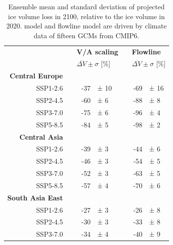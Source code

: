       \begin{table}[htp]
        \centering
        \small

        \caption{Ensemble mean and standard deviation of projected ice volume loss in 2100, relative to the ice volume in 2020. \Vas{} model and flowline model are driven by climate data of fifteen GCMs from CMIP6.}
        \label{tab:cmip}
        
        \begin{tabular}{@{}rlrllrl@{}}
          \toprule
          {} & \phantom{a} & \multicolumn{2}{l}{\textbf{V/A scaling}} & \phantom{a} & \multicolumn{2}{l}{\textbf{Flowline}} \\
          {} & \phantom{a} & \multicolumn{2}{l}{$\overline{\Delta V} \pm \sigma$ [\si{\percent}]} & \phantom{a} & \multicolumn{2}{l}{$\overline{\Delta V} \pm \sigma$ [\si{\percent}]} \\
          \midrule
          \textbf{Central Europe}\\
          SSP1-2.6 & \phantom{a} & -37 & ± 10 & \phantom{a} & -69 & ± 16\\
          SSP2-4.5 & \phantom{a} & -60 & ± 6 & \phantom{a} & -88 & ± 8\\
          SSP3-7.0 & \phantom{a} & -75 & ± 6 & \phantom{a} & -96 & ± 4\\
          SSP5-8.5 & \phantom{a} & -84 & ± 5 & \phantom{a} & -98 & ± 2\\
          \textbf{Central Asia}\\
          SSP1-2.6 & \phantom{a} & -39 & ± 3 & \phantom{a} & -44 & ± 6\\
          SSP2-4.5 & \phantom{a} & -46 & ± 3 & \phantom{a} & -54 & ± 5\\
          SSP3-7.0 & \phantom{a} & -52 & ± 3 & \phantom{a} & -63 & ± 5\\
          SSP5-8.5 & \phantom{a} & -57 & ± 4 & \phantom{a} & -70 & ± 6\\
          \textbf{South Asia East}\\
          SSP1-2.6 & \phantom{a} & -27 & ± 3 & \phantom{a} & -26 & ± 8\\
          SSP2-4.5 & \phantom{a} & -30 & ± 3 & \phantom{a} & -33 & ± 8\\
          SSP3-7.0 & \phantom{a} & -34 & ± 4 & \phantom{a} & -40 & ± 9\\

\end{tabular}
\end{table}
